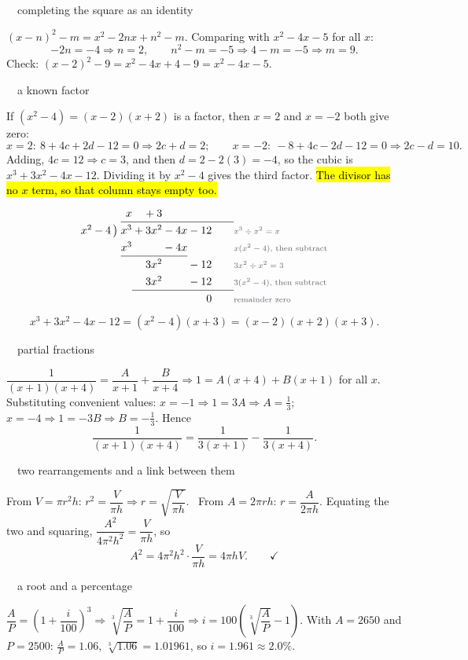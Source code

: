 \documentclass[11pt]{article}
\newcommand{\key}[1]{\hl{#1}}
\newcommand{\solhead}[2]{\medskip{\color{lilacdeep}\bfseries Q#1.}\ \ {\color{greyish}\footnotesize #2}\par\nobreak}
\newcommand{\dstep}[1]{\text{\normalfont\scriptsize\color{greyish}#1}}
\begin{document}
\solhead{19}{completing the square as an identity}
$(x-n)^{2}-m=x^{2}-2nx+n^{2}-m$. Comparing with $x^{2}-4x-5$ for all $x$:
\[-2n=-4\Rightarrow n=2,\qquad n^{2}-m=-5\Rightarrow4-m=-5\Rightarrow m=9.\]
Check: $(x-2)^{2}-9=x^{2}-4x+4-9=x^{2}-4x-5$.\ \checkmark

\solhead{20}{a known factor}
If $(x^{2}-4)=(x-2)(x+2)$ is a factor, then $x=2$ and $x=-2$ both give zero:
\[x=2:\ 8+4c+2d-12=0\Rightarrow2c+d=2;\qquad x=-2:\ -8+4c-2d-12=0\Rightarrow2c-d=10.\]
Adding, $4c=12\Rightarrow c=3$, and then $d=2-2(3)=-4$, so the cubic is $x^{3}+3x^{2}-4x-12$. Dividing it by $x^{2}-4$ gives the third factor. \key{The divisor has no \mbox{$x$} term, so that column stays empty too.}
\[\renewcommand{\arraystretch}{1.3}\setlength{\arraycolsep}{0.17em}
\begin{array}{r@{\;}r@{}r@{}r@{}r@{\qquad}l}
                & x     & {}+3      &       &        & \\ \cline{2-5}
 x^{2}-4\,\big) & x^{3} & {}+3x^{2} & {}-4x & {}-12  & \dstep{$x^{3}\div x^{2}=x$}\\
                & x^{3} &           & {}-4x &        & \dstep{$x(x^{2}-4)$, then subtract}\\ \cline{2-4}
                &       & 3x^{2}    &       & {}-12  & \dstep{$3x^{2}\div x^{2}=3$}\\
                &       & 3x^{2}    &       & {}-12  & \dstep{$3(x^{2}-4)$, then subtract}\\ \cline{3-5}
                &       &           &       & 0      & \dstep{remainder zero}
\end{array}\]
\[x^{3}+3x^{2}-4x-12=(x^{2}-4)(x+3)=(x-2)(x+2)(x+3).\]

\solhead{21}{partial fractions}
$\dfrac{1}{(x+1)(x+4)}=\dfrac{A}{x+1}+\dfrac{B}{x+4}\Rightarrow1=A(x+4)+B(x+1)$ for all $x$.
Substituting convenient values: $x=-1\Rightarrow1=3A\Rightarrow A=\frac13$; \ $x=-4\Rightarrow1=-3B\Rightarrow B=-\frac13$. Hence
\[\frac{1}{(x+1)(x+4)}=\frac{1}{3(x+1)}-\frac{1}{3(x+4)}.\]

\solhead{22}{two rearrangements and a link between them}
From $V=\pi r^{2}h$: $r^{2}=\dfrac{V}{\pi h}\Rightarrow r=\sqrt{\dfrac{V}{\pi h}}$. \ From $A=2\pi rh$: $r=\dfrac{A}{2\pi h}$.
Equating the two and squaring, $\dfrac{A^{2}}{4\pi^{2}h^{2}}=\dfrac{V}{\pi h}$, so
\[A^{2}=4\pi^{2}h^{2}\cdot\frac{V}{\pi h}=4\pi hV. \qquad\checkmark\]

\solhead{23}{a root and a percentage}
$\dfrac AP=\left(1+\dfrac{i}{100}\right)^{3}\Rightarrow\sqrt[3]{\dfrac AP}=1+\dfrac{i}{100}
\Rightarrow i=100\left(\sqrt[3]{\dfrac AP}-1\right).$
With $A=2650$ and $P=2500$: $\frac AP=1.06$, $\sqrt[3]{1.06}=1.01961$, so $i=1.961\approx\mathbf{2.0\%}$.
\end{document}

